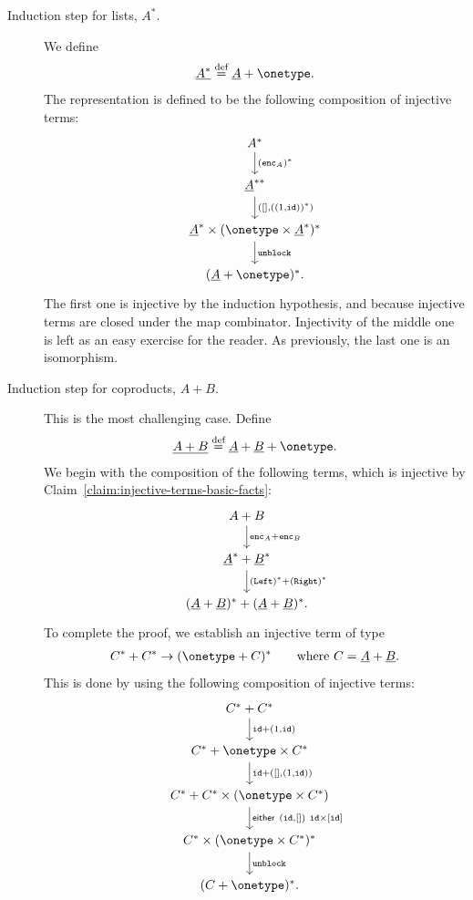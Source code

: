 \begin{description}
    \item[Induction step for lists, $A^*$.] We define 
    \begin{align*}
    \underline{A^*} \eqdef \underline A + \onetype.
    \end{align*}
    The representation is defined to be the following composition of injective  terms:
    \[
    \begin{tikzcd}
    A^*
    \ar[d, "{(\stringrep A)^*}"] \\
    \underline A^{**} \ar[d, "{([] , ((\onelement,\idterm))^*)}"] \\
    \underline A^* \times (\onetype \times \underline A^*)^* \ar[d,"\unblockterm"] \\
    (\underline A + \onetype)^*.
    \end{tikzcd}
    \]
    The first one is injective by the induction hypothesis, and because injective terms are closed under the map combinator. Injectivity of the middle one is left as an easy exercise for the reader. As previously, the  last one is  an isomorphism.
    \item[Induction step for coproducts, $A+B$.] This is the most challenging case. Define
\begin{align*}
    \underline{A+B} \eqdef    \underline A + \underline B + \onetype.
\end{align*}
We begin with the composition of the following terms, which is injective by Claim~\ref{claim:injective-terms-basic-facts}: 
\[
\begin{tikzcd}
A + B  
\ar[d,"\stringrep A + \stringrep B"] \\
\underline A^* + \underline B^*  
\ar[d, "(\leftterm)^* + (\rightterm)^*"] \\
(\underline A + \underline B)^* + (\underline A + \underline B)^*.
\end{tikzcd}
\]
To complete the proof, we establish an injective  term of type 
\begin{align*}
 C^* + C^* \to  (\onetype + C)^* \qquad \text{where }C = \underline A + \underline B.
\end{align*}
This is done by using the following composition of injective  terms:
        \[
        \begin{tikzcd}
        C^* + C^* 
        \ar[d,"{\idterm + (\onelement,\idterm)}"] \\
        C^* + \onetype \times C^*
        \ar[d, "{\idterm + ([], (\onelement, \idterm))}"] \\
        C^* + C^* \times (\onetype \times C^*)
        \ar[d, 
        "{\either{(\idterm , [])}{\idterm \times [\idterm]}}"] \\
         C^* \times (\onetype \times C^*)^*
         \ar[d,"\unblockterm"] \\
         (C + \onetype)^*.
        \end{tikzcd}
        \]
    \end{description}

